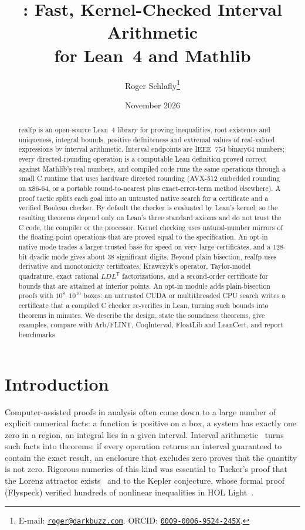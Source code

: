 \documentclass[11pt]{article}
\title{\realfp: Fast, Kernel-Checked Interval Arithmetic\\ for Lean~4 and Mathlib}
\author{Roger Schlafly\thanks{E-mail: \href{mailto:roger@darkbuzz.com}{\texttt{roger@darkbuzz.com}}.
ORCID: \href{https://orcid.org/0009-0006-9524-245X}{\texttt{0009-0006-9524-245X}}.}}
\date{November 2026}
\theoremstyle{definition}
\theoremstyle{remark}
\newcommand{\realfp}{\textsf{realfp}}
\begin{document}
\maketitle

\begin{abstract}
\realfp{} is an open-source Lean~4 library for proving inequalities, root
existence and uniqueness, integral bounds, positive definiteness and extremal
values of real-valued expressions by interval arithmetic. Interval endpoints
are IEEE~754 binary64 numbers; every directed-rounding operation is a
computable Lean definition proved correct against Mathlib's real numbers, and
compiled code runs the same operations through a small C runtime that uses
hardware directed rounding (AVX-512 embedded rounding on x86-64, or a portable
round-to-nearest plus exact-error-term method elsewhere). A proof tactic
splits each goal into an untrusted native search for a certificate and a
verified Boolean checker. By default the checker is evaluated by Lean's
kernel, so the resulting theorems depend only on Lean's three standard axioms
and do not trust the C code, the compiler or the processor. Kernel checking
uses natural-number mirrors of the floating-point operations that are proved
equal to the specification. An opt-in native mode trades a larger trusted
base for speed on very large certificates, and a 128-bit dyadic mode gives
about 38 significant digits. Beyond plain bisection, \realfp{} uses derivative
and monotonicity certificates, Krawczyk's operator, Taylor-model quadrature,
exact rational $LDL^{\mathsf T}$ factorizations, and a second-order
certificate for bounds that are attained at interior points. An opt-in
module adds plain-bisection proofs with $10^8$--$10^{10}$ boxes: an untrusted
CUDA or multithreaded CPU search writes a certificate that a compiled C
checker re-verifies in Lean, turning such bounds into theorems in minutes.
We describe the
design, state the soundness theorems, give examples, compare with Arb/FLINT,
CoqInterval, FloatLib and LeanCert, and report benchmarks.
\end{abstract}

\section{Introduction}

Computer-assisted proofs in analysis often come down to a large number of
explicit numerical facts: a function is positive on a box, a system has
exactly one zero in a region, an integral lies in a given interval.
Interval arithmetic~\cite{moore2009} turns such facts into theorems: if every
operation returns an interval guaranteed to contain the exact result, an
enclosure that excludes zero proves that the quantity is not zero. Rigorous
numerics of this kind was essential to Tucker's proof that the Lorenz
attractor exists~\cite{tucker2002} and to the Kepler conjecture, whose
formal proof (Flyspeck) verified hundreds of nonlinear inequalities in HOL
Light~\cite{flyspeck,solovyevhales2013}.
\end{document}
